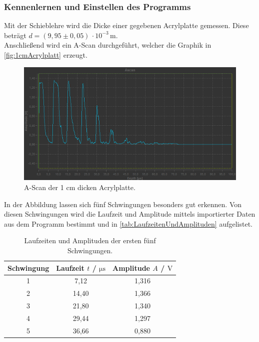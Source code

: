 \subsubsection{Kennenlernen und Einstellen des Programms}

  Mit der Schieblehre wird die Dicke einer gegebenen Acrylplatte gemessen. Diese beträgt $d=(9,95 \pm 0,05) \, \cdot 10^{-3} \, \mathrm{m}$.\\
  Anschließend wird ein A-Scan durchgeführt, welcher die Graphik in \autoref{fig:1cmAcrylplatt} erzeugt.\\
  \begin{figure}
    \centering
    \includegraphics[width=15cm]{messwerte/Vorbereitung/AScan_Vorbereitung.png}
    \caption{A-Scan der 1 cm dicken Acrylplatte.}
    \label{fig:1cmAcrylplatt}
  \end{figure}
  In der Abbildung lassen sich fünf Schwingungen besonders gut erkennen. Von diesen Schwingungen wird die Laufzeit und
  Amplitude mittels importierter Daten aus dem Programm bestimmt und in \autoref{tab:LaufzeitenUndAmplituden} aufgelistet.
  \begin{table}
    \centering
    \caption{Laufzeiten und Amplituden der ersten fünf Schwingungen.}
    \label{tab:LaufzeitenUndAmplituden}
    \begin{tabular}{c | c c}
      Schwingung & Laufzeit $t$ / $\si{\micro\second}$ & Amplitude $A$ / $\si{\volt}$ \\
        \midrule
          1 & 7,12  & 1,316 \\
          2 & 14,40  & 1,366 \\
          3 & 21,80  & 1,340 \\
          4 & 29,44  & 1,297 \\
          5 & 36,66  & 0,880 \\
        \bottomrule
      \end{tabular}
  \end{table}
